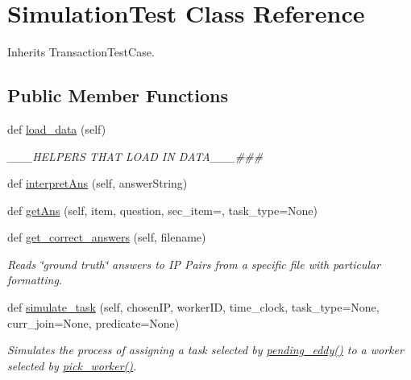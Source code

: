 \hypertarget{classdynamicfilterapp_1_1test__simulations_1_1_simulation_test}{}\section{Simulation\+Test Class Reference}
\label{classdynamicfilterapp_1_1test__simulations_1_1_simulation_test}


Inherits Transaction\+Test\+Case.

\subsection*{Public Member Functions}
\begin{DoxyCompactItemize}
\item 
def \hyperlink{classdynamicfilterapp_1_1test__simulations_1_1_simulation_test_a3e78e589cce2f0b893a227e23c51a87b}{load\+\_\+data} (self)
\begin{DoxyCompactList}\small\item\em \+\_\+\+\_\+\+\_\+\+H\+E\+L\+P\+E\+RS T\+H\+AT L\+O\+AD IN D\+A\+T\+A\+\_\+\+\_\+\+\_\+\#\#\# \end{DoxyCompactList}\item 
def \hyperlink{classdynamicfilterapp_1_1test__simulations_1_1_simulation_test_a2b105c6da535dfcd9ad506bd77a5c574}{interpret\+Ans} (self, answer\+String)
\item 
def \hyperlink{classdynamicfilterapp_1_1test__simulations_1_1_simulation_test_ae53b544987bdb14f48c8b971b3934aea}{get\+Ans} (self, item, question, sec\+\_\+item=\textquotesingle{}\textquotesingle{}, task\+\_\+type=\textquotesingle{}None\textquotesingle{})
\item 
def \hyperlink{classdynamicfilterapp_1_1test__simulations_1_1_simulation_test_a395b393866987a38160e3a44d9958d92}{get\+\_\+correct\+\_\+answers} (self, filename)
\begin{DoxyCompactList}\small\item\em Reads \char`\"{}ground truth\char`\"{} answers to IP Pairs from a specific file with particular formatting. \end{DoxyCompactList}\item 
def \hyperlink{classdynamicfilterapp_1_1test__simulations_1_1_simulation_test_a8bed8f0f57234f8356ce3bc19606c6bf}{simulate\+\_\+task} (self, chosen\+IP, worker\+ID, time\+\_\+clock, task\+\_\+type=None, curr\+\_\+join=None, predicate=None)
\begin{DoxyCompactList}\small\item\em Simulates the process of assigning a task selected by \hyperlink{namespacedynamicfilterapp_1_1views__helpers_ad11bcb9737901ab723493b4f7fe09329}{pending\+\_\+eddy()} to a worker selected by \hyperlink{classdynamicfilterapp_1_1test__simulations_1_1_simulation_test_acb17139f8e2f7a4b835ec1c05400e8c2}{pick\+\_\+worker()}. \end{DoxyCompactList}\item 

\end{DoxyCompactItemize}
